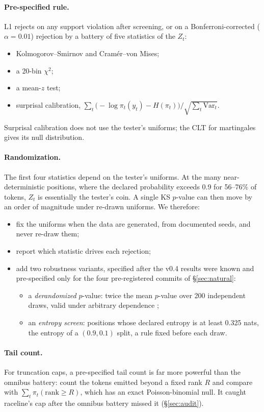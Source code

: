 \documentclass[10pt]{article}
\theoremstyle{remark}
\begin{document}
\paragraph{Pre-specified rule.} L1 rejects on any support violation after screening, or on a Bonferroni-corrected ($\alpha=0.01$) rejection by a battery of five statistics of the $Z_t$:
\begin{itemize}
\item Kolmogorov--Smirnov and Cram\'er--von Mises;
\item a 20-bin $\chi^2$;
\item a mean-$z$ test;
\item surprisal calibration, $\sum_t\big(-\log\pi_t(y_t)-H(\pi_t)\big)/\sqrt{\sum_t\mathrm{Var}_t}$.
\end{itemize}
Surprisal calibration does not use the tester's uniforms; the CLT for martingales gives its null distribution.

\paragraph{Randomization.} The first four statistics depend on the tester's uniforms. At the many near-deterministic positions, where the declared probability exceeds 0.9 for 56--76\% of tokens, $Z_t$ is essentially the tester's coin. A single KS $p$-value can then move by an order of magnitude under re-drawn uniforms. We therefore:
\begin{itemize}
\item fix the uniforms when the data are generated, from documented seeds, and never re-draw them;
\item report which statistic drives each rejection;
\item add two robustness variants, specified after the v0.4 results were known and pre-specified only for the four pre-registered commits of \S\ref{sec:natural}:
  \begin{itemize}
  \item a \emph{derandomized} $p$-value: twice the mean $p$-value over 200 independent draws, valid under arbitrary dependence \cite{vovkwang2020};
  \item an \emph{entropy screen}: positions whose declared entropy is at least 0.325 nats, the entropy of a $(0.9,0.1)$ split, a rule fixed before each draw.
  \end{itemize}
\end{itemize}

\paragraph{Tail count.} For truncation caps, a pre-specified tail count is far more powerful than the omnibus battery: count the tokens emitted beyond a fixed rank $R$ and compare with $\sum_t\pi_t(\text{rank}\ge R)$, which has an exact Poisson-binomial null. It caught raceline's cap after the omnibus battery missed it (\S\ref{sec:audit}).
\end{document}

